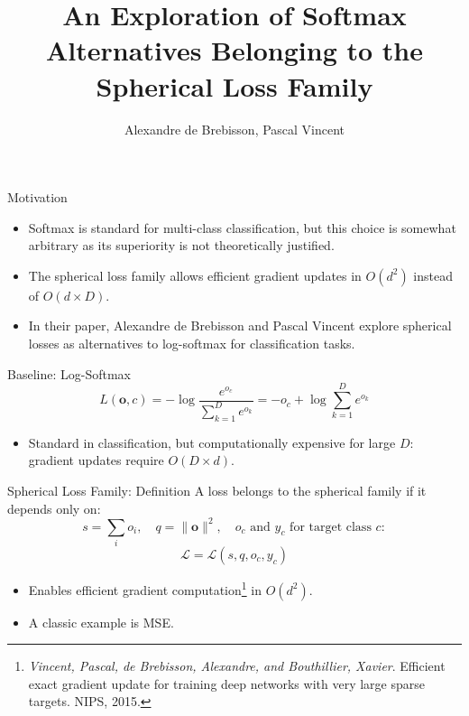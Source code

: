 \documentclass{beamer}
\title{An Exploration of Softmax Alternatives Belonging to the Spherical Loss Family}
\author{Alexandre de Brebisson, Pascal Vincent}
\institute{Talk by: Fedor Sobolevsky}
\date{}
\begin{document}
\begin{frame}
\titlepage
\end{frame}

\begin{frame}{Motivation}
\begin{itemize}
    \item Softmax is standard for multi-class classification, but this choice is somewhat arbitrary as its superiority is not theoretically justified.
    \item The spherical loss family allows efficient gradient updates in $O(d^2)$ instead of $O(d \times D)$.
    \item In their paper, Alexandre de Brebisson and Pascal Vincent explore spherical losses as alternatives to log-softmax for classification tasks.
\end{itemize}
\end{frame}

\begin{frame}{Baseline: Log-Softmax}
\[
L(\boldsymbol{o}, c) = -\log\frac{e^{o_c}}{\sum_{k=1}^D e^{o_k}} = -o_c + \log \sum_{k=1}^D e^{o_k}
\]
\begin{itemize}
    \item Standard in classification, but computationally expensive for large $D$: gradient updates require $O(D\times d)$.
\end{itemize}
\end{frame}

\begin{frame}{Spherical Loss Family: Definition}
A loss belongs to the spherical family if it depends only on:
\[
s = \sum_i o_i,\quad q = \|\boldsymbol{o}\|^2,\quad o_c \text{ and } y_c \text{ for target class } c:
\]
\[
\mathcal{L} = \mathcal{L}(s, q, o_c, y_c)
\]
\begin{itemize}
    \item Enables efficient gradient computation\footnote{\textit{Vincent, Pascal, de Brebisson, Alexandre, and Bouthillier, Xavier}. Efficient exact gradient update for training deep networks with very large sparse targets. NIPS, 2015.} in $O(d^2)$.
    \item A classic example is MSE. 
    \end{itemize}
\end{frame}
\end{document}
